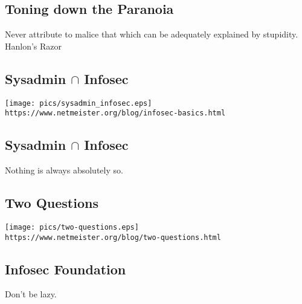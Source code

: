 \documentclass[xga]{xdvislides}
\begin{document}
\subsection{Toning down the Paranoia}
\vspace*{\fill}
\Huge
\begin{center}
Never attribute to malice that which can be adequately explained by stupidity. \\
\vspace{.25in}
\Normalsize
Hanlon's Razor
\end{center}
\Normalsize
\vspace*{\fill}

\subsection{Sysadmin $\cap$ Infosec}
\vspace*{\fill}
\begin{center}
	\texttt{[image: pics/sysadmin\_infosec.eps]} \\
	\verb+https://www.netmeister.org/blog/infosec-basics.html+
\end{center}
\vspace*{\fill}

\subsection{Sysadmin $\cap$ Infosec}
\vspace*{\fill}
\Huge
\begin{center}
	Nothing is always absolutely so.
\end{center}
\Normalsize
\vspace*{\fill}

\subsection{Two Questions}
\vspace*{\fill}
\begin{center}
	\texttt{[image: pics/two-questions.eps]} \\
\small
	\verb+https://www.netmeister.org/blog/two-questions.html+
\end{center}
\Normalsize
\vspace*{\fill}

\subsection{Infosec Foundation}
\vspace*{\fill}
\Huge
\begin{center}
	Don't be lazy.
\end{center}
\Normalsize
\vspace*{\fill}
\end{document}

